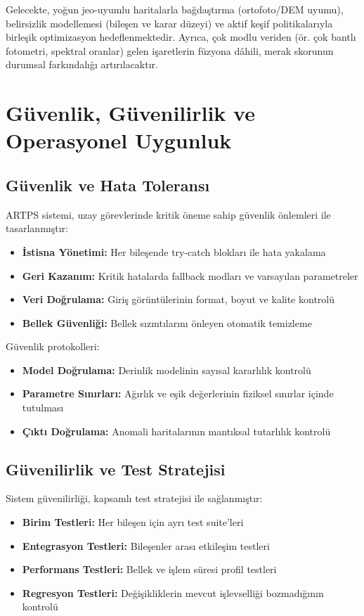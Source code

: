 \documentclass[12pt]{article}
\begin{document}
Gelecekte, yoğun jeo-uyumlu haritalarla bağdaştırma (ortofoto/DEM uyumu), belirsizlik modellemesi (bileşen ve karar düzeyi) ve aktif keşif politikalarıyla birleşik optimizasyon hedeflenmektedir. Ayrıca, çok modlu veriden (ör. çok bantlı fotometri, spektral oranlar) gelen işaretlerin füzyona dâhili, merak skorunun durumsal farkındalığı artırılacaktır.

\section{Güvenlik, Güvenilirlik ve Operasyonel Uygunluk}
\subsection{Güvenlik ve Hata Toleransı}
ARTPS sistemi, uzay görevlerinde kritik öneme sahip güvenlik önlemleri ile tasarlanmıştır:

\begin{itemize}
\item \textbf{İstisna Yönetimi:} Her bileşende try-catch blokları ile hata yakalama
\item \textbf{Geri Kazanım:} Kritik hatalarda fallback modları ve varsayılan parametreler
\item \textbf{Veri Doğrulama:} Giriş görüntülerinin format, boyut ve kalite kontrolü
\item \textbf{Bellek Güvenliği:} Bellek sızıntılarını önleyen otomatik temizleme
\end{itemize}

Güvenlik protokolleri:
\begin{itemize}
\item \textbf{Model Doğrulama:} Derinlik modelinin sayısal kararlılık kontrolü
\item \textbf{Parametre Sınırları:} Ağırlık ve eşik değerlerinin fiziksel sınırlar içinde tutulması
\item \textbf{Çıktı Doğrulama:} Anomali haritalarının mantıksal tutarlılık kontrolü
\end{itemize}

\subsection{Güvenilirlik ve Test Stratejisi}
Sistem güvenilirliği, kapsamlı test stratejisi ile sağlanmıştır:

\begin{itemize}
\item \textbf{Birim Testleri:} Her bileşen için ayrı test suite'leri
\item \textbf{Entegrasyon Testleri:} Bileşenler arası etkileşim testleri
\item \textbf{Performans Testleri:} Bellek ve işlem süresi profil testleri
\item \textbf{Regresyon Testleri:} Değişikliklerin mevcut işlevselliği bozmadığının kontrolü
\end{itemize}
\end{document}
